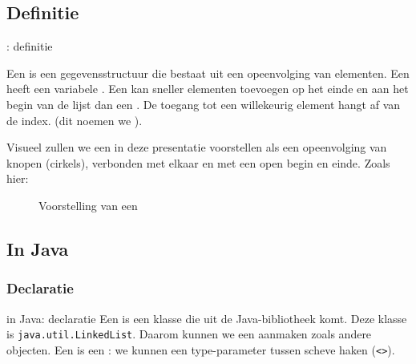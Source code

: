 \subsection{Definitie}
\begin{frame}{\dslinkedlist{}: definitie}
\begin{definition}[\dslinkedlist{}]
Een \term{\dslinkedlist{}} is een gegevensstructuur die bestaat uit een opeenvolging van elementen. Een \dslinkedlist{} heeft een variabele . Een \dslinkedlist{} kan sneller elementen toevoegen op het einde en aan het begin van de lijst dan een \dsarraylist{}. De toegang tot een willekeurig element hangt af van de index. (dit noemen we ).
\end{definition}
Visueel zullen we een \dslinkedlist{} in deze presentatie voorstellen als een opeenvolging van knopen (cirkels), verbonden met elkaar en met een open begin en einde. Zoals hier:
\begin{figure}
\caption{Voorstelling van een \dslinkedlist{}}
\end{figure}
\end{frame}
\subsection{In Java}
\subsubsection{Declaratie}
\begin{frame}[fragile]{\dslinkedlist{} in Java: declaratie}
Een \dslinkedlist{} is een klasse die uit de Java-bibliotheek komt. Deze klasse is \texttt{java.util.LinkedList}. Daarom kunnen we een \dslinkedlist{} aanmaken zoals andere objecten. Een \dslinkedlist{} is een : we kunnen een type-parameter tussen scheve haken (\texttt{<>}).
\end{frame}
